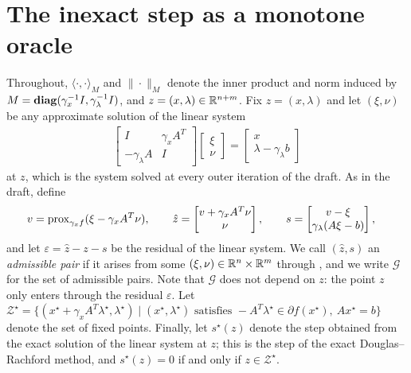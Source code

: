 \section{The inexact step as a monotone oracle}\label{sec:acc-oracle}
Throughout, $\langle \cdot, \cdot \rangle_M$ and $\|\cdot\|_M$ denote the inner product and norm induced by $M = \mathop{\bf diag}(\gamma_x^{-1} I, \gamma_\lambda^{-1} I)$, and $z = (x, \lambda) \in \mathbb{R}^{n+m}$.
Fix $z = (x,\lambda)$ and let $(\xi, \nu)$ be any approximate solution of the linear system
\begin{align}
    \begin{bmatrix} I & \gamma_x A^T \\ -\gamma_\lambda A & I \end{bmatrix}
    \begin{bmatrix} \xi \\ \nu \end{bmatrix}
    = \begin{bmatrix} x \\ \lambda - \gamma_\lambda b \end{bmatrix} \label{eq:acc-linear-system}
\end{align}
at $z$, which is the system solved at every outer iteration of the draft.
As in the draft, define
\begin{align}
    v &= \mathrm{prox}_{\gamma_x f}(\xi - \gamma_x A^T \nu), \qquad
    \hat{z} = \begin{bmatrix} v + \gamma_x A^T \nu \\ \nu \end{bmatrix}, \qquad
    s = \begin{bmatrix} v - \xi \\ \gamma_\lambda (A\xi - b) \end{bmatrix}, \label{eq:acc-step-definitions}
\end{align}
and let $\varepsilon = \hat{z} - z - s$ be the residual of the linear system.
We call $(\hat z, s)$ an \emph{admissible pair} if it arises from some $(\xi, \nu) \in \mathbb{R}^n \times \mathbb{R}^m$ through , and we write $\mathcal{G}$ for the set of admissible pairs.
Note that $\mathcal{G}$ does not depend on $z$: the point $z$ only enters through the residual $\varepsilon$.
Let $\mathcal{Z}^\star = \{ (x^\star + \gamma_x A^T\lambda^\star, \lambda^\star) \mid (x^\star,\lambda^\star) \text{ satisfies } -A^T\lambda^\star \in \partial f(x^\star),\ Ax^\star = b \}$ denote the set of fixed points.
Finally, let $s^\star(z)$ denote the step  obtained from the exact solution of the linear system at $z$; this is the step of the exact Douglas--Rachford method, and $s^\star(z) = 0$ if and only if $z \in \mathcal{Z}^\star$.

